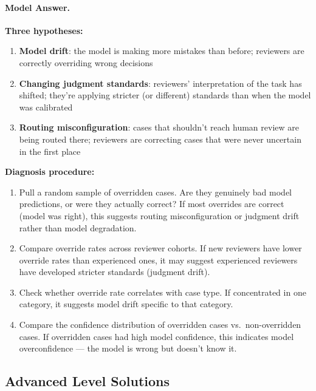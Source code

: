 \paragraph{Model Answer.}

\textbf{Three hypotheses:}
\begin{enumerate}
    \item \textbf{Model drift}: the model is making more mistakes than before; reviewers are correctly overriding wrong decisions
    \item \textbf{Changing judgment standards}: reviewers' interpretation of the task has shifted; they're applying stricter (or different) standards than when the model was calibrated
    \item \textbf{Routing misconfiguration}: cases that shouldn't reach human review are being routed there; reviewers are correcting cases that were never uncertain in the first place
\end{enumerate}

\textbf{Diagnosis procedure:}
\begin{enumerate}
    \item Pull a random sample of overridden cases. Are they genuinely bad model predictions, or were they actually correct? If most overrides are correct (model was right), this suggests routing misconfiguration or judgment drift rather than model degradation.
    \item Compare override rates across reviewer cohorts. If new reviewers have lower override rates than experienced ones, it may suggest experienced reviewers have developed stricter standards (judgment drift).
    \item Check whether override rate correlates with case type. If concentrated in one category, it suggests model drift specific to that category.
    \item Compare the confidence distribution of overridden cases vs.\ non-overridden cases. If overridden cases had high model confidence, this indicates model overconfidence --- the model is wrong but doesn't know it.
\end{enumerate}

\subsection{Advanced Level Solutions}

